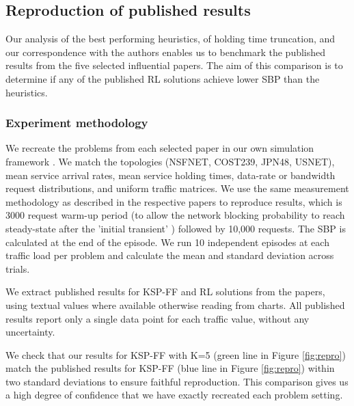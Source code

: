 \subsection{Reproduction of published results}
\label{sec:repro}
Our analysis of the best performing heuristics, of holding time truncation, and our correspondence with the authors enables us to benchmark the published results from the five selected influential papers. The aim of this comparison is to determine if any of the published RL solutions achieve lower SBP than the heuristics. %


\subsubsection{Experiment methodology}


We recreate the problems from each selected paper in our own simulation framework \cite{doherty_xlron_2024}. We match the topologies (NSFNET, COST239, JPN48, USNET), mean service arrival rates, mean service holding times, data-rate or bandwidth request distributions, and uniform traffic matrices. We use the same measurement methodology as described in the respective papers to reproduce results, which is 3000 request warm-up period (to allow the network blocking probability to reach steady-state after the 'initial transient' \cite{white_problem_2009}) followed by 10,000 requests. The SBP is calculated at the end of the episode. We run 10 independent episodes at each traffic load per problem and calculate the mean and standard deviation across trials.

We extract published results for KSP-FF and RL solutions from the papers, using textual values where available otherwise reading from charts. All published results report only a single data point for each traffic value, without any uncertainty. %

We check that our results for KSP-FF with K=5 (green line in Figure \ref{fig:repro}) match the published results for KSP-FF (blue line in Figure \ref{fig:repro}) within two standard deviations to ensure faithful reproduction. This comparison gives us a high degree of confidence that we have exactly recreated each problem setting.



